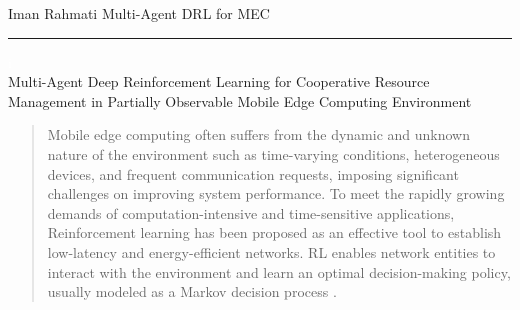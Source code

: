 \documentclass[12pt]{article}
\begin{document}
	

	
%



\begin{center} 
	
	
	\vspace{-17mm}
	
	\large Iman Rahmati  \hfill Multi-Agent DRL for MEC\vspace{1mm} \hrule
	
	\vspace{-1mm}
	
	\textcolor{white}{i} \\ \LARGE Multi-Agent Deep Reinforcement Learning for Cooperative Resource Management in Partially Observable Mobile Edge Computing Environment \vspace{6mm}\\
	
\end{center}



\vspace{-8mm}

\begin{abstract}
	\vspace{-2mm}
	\noindent
	Mobile edge computing often suffers from the dynamic and unknown nature of the environment such as time-varying conditions, heterogeneous devices, and frequent communication requests, imposing significant challenges on improving system performance. To meet the rapidly growing demands of computation-intensive and time-sensitive applications, Reinforcement learning \cite{mnih2015human} has been proposed as an effective tool to establish low-latency and energy-efficient networks. RL enables network entities to interact with the environment and learn an optimal decision-making policy, usually modeled as a Markov decision process \cite{puterman2014markov}.
\end{abstract}



	
\vspace{4mm}
\end{document}
